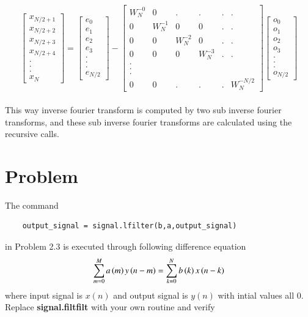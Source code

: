 \documentclass[journal,12pt,twocolumn]{IEEEtran}
\begin{document}
\begin{equation}
\begin{bmatrix}
x_{N/2+1} \\
x_{N/2+2} \\
x_{N/2+3} \\
x_{N/2+4} \\
. \\
. \\
. \\
x_{N}
\end{bmatrix}
= 
\begin{bmatrix}
e_{0} \\
e_{1} \\
e_{2} \\
e_{3} \\
. \\
. \\
. \\
e_{N/2}
\end{bmatrix}
-
\begin{bmatrix}
W^{-0}_{N} & 0  &. &. &.&. \\
0 & W^{-1}_{N} & 0 & 0 &. &. \\
0 & 0 & W^{-2}_{N} & 0 &. &. \\
0 & 0 & 0 & W^{-3}_{N} &. &.\\
.\\
.\\
.\\
0 & 0 &. &.&. &W^{-N/2}_{N}
\end{bmatrix}
\begin{bmatrix}
o_{0} \\
o_{1} \\
o_{2} \\
o_{3} \\
. \\
. \\
. \\
o_{N/2}
\end{bmatrix}
\end{equation}
\\
This way inverse fourier transform is computed by two sub inverse fourier transforms, and these sub inverse fourier transforms are calculated using the recursive calls.
\section{Problem}
The command
\begin{lstlisting}
    output_signal = signal.lfilter(b,a,output_signal)
\end{lstlisting}
in Problem 2.3 is executed through following difference equation 
    \begin{align}
        \sum _{m=0}^{M}a\left(m\right)y\left(n-m\right)=\sum _{k=0}^{N}b\left(k\right)x\left(n-k\right)
    \end{align}
 where input signal is $x(n)$ and output signal is $y(n)$ with intial values all 0. Replace \textbf{signal.filtfilt} with your own routine and verify
\end{document}

